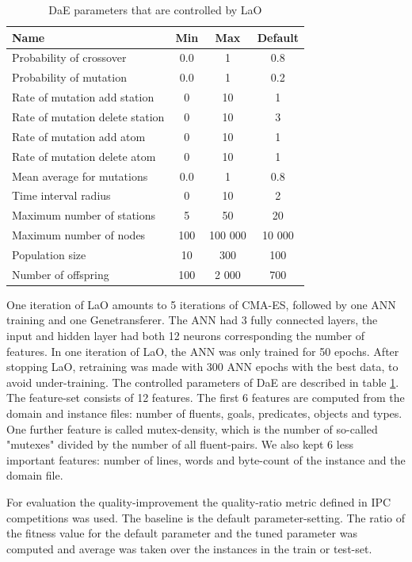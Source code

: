 \documentclass{MYsig-alternate}
\begin{document}
\begin{table}[ht] \small
\centering
\begin{tabular}{l c c c}
\hline\hline
Name & Min & Max & Default \\ 
\hline
Probability of crossover & 0.0 & 1 & 0.8 \\
Probability of mutation & 0.0& 1& 0.2 \\
Rate of mutation add station& 0& 10& 1 \\
Rate of mutation delete station& 0& 10& 3 \\
Rate of mutation add atom& 0& 10& 1 \\
Rate of mutation delete atom& 0& 10& 1 \\
Mean average for mutations& 0.0& 1& 0.8 \\
Time interval radius& 0& 10& 2 \\
Maximum number of stations& 5& 50& 20 \\
Maximum number of nodes& 100& 100 000& 10 000 \\
Population size& 10& 300& 100 \\
Number of offspring & 100& 2 000& 700 \\
\hline
\end{tabular}
\caption{DaE parameters that are controlled by LaO}
\label{table:parameters}
\end{table} 

One iteration of LaO amounts to 5 iterations of CMA-ES, followed by one ANN training and one Genetransferer. The ANN had 3 fully connected layers, the input and hidden layer had both 12 neurons corresponding the number of features. In one iteration of LaO, the ANN was only trained for 50 epochs. After stopping LaO, retraining was made with 300 ANN epochs with the best data, to avoid under-training. The controlled parameters of DaE are described in table \ref{table:parameters}. The feature-set consists of 12 features. The first 6 features are computed from the domain and instance files: number of fluents, goals, predicates, objects and types. One further feature is called mutex-density, which is the number of so-called "mutexes" divided by the number of all fluent-pairs. We also kept 6 less important features: number of lines, words and byte-count of the instance and the domain file.

For evaluation the quality-improvement the quality-ratio metric defined in IPC competitions was used. The baseline is the default parameter-setting. The ratio of the fitness value for the default parameter and the tuned parameter was computed and average was taken over the instances in the train or test-set. 
\end{document}
